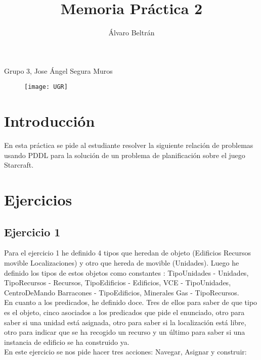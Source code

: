 \documentclass[a4paper,11pt]{article}
\title{Memoria Práctica 2}
\author{Álvaro Beltrán}
\begin{document}
\maketitle
\begin{center}
Grupo 3, Jose Ángel Segura Muros
\end{center}

\begin{figure}[h]
\texttt{[image: UGR]}
\centering
\end{figure}

\newpage

\section{Introducción}
En esta práctica se pide al estudiante resolver la siguiente relación de problemas usando PDDL para la solución de un problema de planificación sobre el juego Starcraft.

\section{Ejercicios}

\subsection{Ejercicio 1}
Para el ejercicio 1 he definido 4 tipos que heredan de objeto (Edificios Recursos movible Localizaciones) y otro que hereda de movible (Unidades). Luego he definido los tipos de estos objetos como constantes : TipoUnidades - Unidades, TipoRecursos - Recursos, TipoEdificios - Edificios, VCE - TipoUnidades, CentroDeMando Barracones - TipoEdificios, Minerales Gas - TipoRecursos.\\

En cuanto a los predicados, he definido doce. Tres de ellos para saber de que tipo es el objeto, cinco asociados a los predicados que pide el enunciado, otro para saber si una unidad está asignada, otro para saber si la localización está libre, otro para indicar que se ha recogido un recurso y un último para saber si una instancia de edificio se ha construido ya.\\

En este ejercicio se nos pide hacer tres acciones: Navegar, Asignar y construir:
\end{document}
